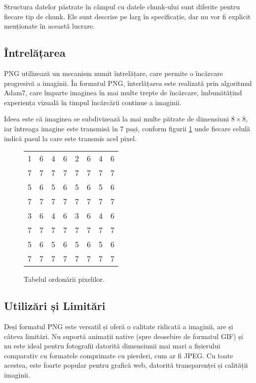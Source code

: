 \documentclass[a4paper,12pt]{report}
\begin{document}
Structura datelor păstrate în câmpul cu datele chunk-ului sunt diferite pentru fiecare tip de chunk.
Ele sunt descrise pe larg în specificație, dar nu vor fi explicit menționate în această lucrare.

\subsection{Întrelățarea}

\ac{PNG} utilizează un mecanism numit întrelățare,
care permite o încărcare progresivă a imaginii.
În formatul \ac{PNG}, înterlățarea este realizată prin algoritmul Adam7,
care împarte imaginea în mai multe trepte de încărcare,
îmbunătățind experiența vizuală în timpul încărcării continue a imaginii.

Ideea este că imaginea se subdivizează la mai multe pătrate de dimensiuni $8 \times 8$,
iar întreaga imagine este transmisă în 7 pași, conform figurii \ref{fig:pixel_order_table} unde
fiecare celulă indică pasul la care este transmis acel pixel.

\begin{figure}[!ht]
\centering
\begin{tabular}{c c c c c c c c}
    1 & 6 & 4 & 6 & 2 & 6 & 4 & 6 \\
    7 & 7 & 7 & 7 & 7 & 7 & 7 & 7 \\
    5 & 6 & 5 & 6 & 5 & 6 & 5 & 6 \\
    7 & 7 & 7 & 7 & 7 & 7 & 7 & 7 \\
    3 & 6 & 4 & 6 & 3 & 6 & 4 & 6 \\
    7 & 7 & 7 & 7 & 7 & 7 & 7 & 7 \\
    5 & 6 & 5 & 6 & 5 & 6 & 5 & 6 \\
    7 & 7 & 7 & 7 & 7 & 7 & 7 & 7 \\
\end{tabular}
\caption{Tabelul ordonării pixelilor.}
\label{fig:pixel_order_table}
\end{figure}

\subsection{Utilizări și Limitări}

Deși formatul \ac{PNG} este versatil și oferă o calitate ridicată a imaginii, are și câteva limitări.
Nu suportă animații native (spre deosebire de formatul \ac{GIF})
și nu este ideal pentru fotografii datorită dimensiunii mai mari a fișierului comparativ
cu formatele comprimate cu pierderi, cum ar fi \ac{JPEG}.
Cu toate acestea, este foarte popular pentru grafică web,
datorită transparenței și calității imaginii.
\end{document}
